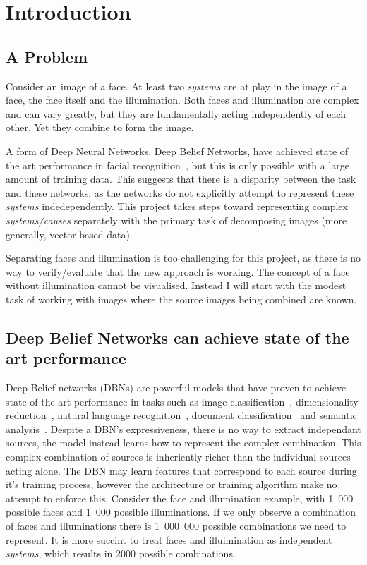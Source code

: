 \chapter{Introduction}

\section{A Problem}
Consider an image of a face. At least two \emph{systems} are at play in the image of a face, the face itself and the illumination. Both faces and illumination are complex and can vary greatly, but they are fundamentally acting independently of each other. Yet they combine to form the image.

A form of Deep Neural Networks, Deep Belief Networks, have achieved state of the art performance in facial recognition~\cite{huang2012learning,liu2014facial}, but this is only possible with a large amount of training data. This suggests that there is a disparity between the task and these networks, as the networks do not explicitly attempt to represent these \emph{systems} indedependently. This project takes steps toward representing complex \emph{systems/causes} separately with the primary task of decomposing images (more generally, vector based data).

Separating faces and illumination is too challenging for this project, as there is no way to verify/evaluate that the new approach is working. The concept of a face without illumination cannot be visualised. Instead I will start with the modest task of working with images where the source images being combined are known.

\section{Deep Belief Networks can achieve state of the art performance}
Deep Belief networks (DBNs) are powerful models that have proven to achieve state of the art performance in tasks such as image classification~\cite{5649922, Hinton:2006:FLA:1161603.1161605}, dimensionality reduction~\cite{noulas2008deep}, natural language recognition~\cite{Hinton:38131ww}, document classification~\cite{mcafee2008document} and semantic analysis~\cite{kim2012learning}.
Despite a DBN's expressiveness, there is no way to extract independant sources, the model instead learns how to represent the complex combination. This complex combination of sources is inheriently richer than the individual sources acting alone. The DBN may learn features that correspond to each source during it's training process, however the architecture or training algorithm make no attempt to enforce this. Consider the face and illumination example, with 1~000 possible faces and 1~000 possible illuminations. If we only observe a combination of faces and illuminations there is 1~000~000 possible combinations we need to represent. It is more succint to treat faces and illuimination as independent \emph{systems}, which results in 2000 possible combinations.

